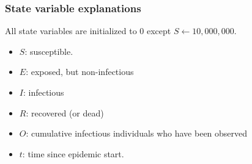 \documentclass{article}
\begin{document}
\subsubsection{State variable explanations}
All state variables are initialized to 0 except $S \gets 10,000,000$. 

\begin{itemize}
    \item $S$: susceptible.
    \item $E$: exposed, but non-infectious
    \item $I$: infectious
    \item $R$: recovered (or dead)
    \item $O$: cumulative infectious individuals who have been observed 
    \item $t$: time since epidemic start.
\end{itemize}
\end{document}
